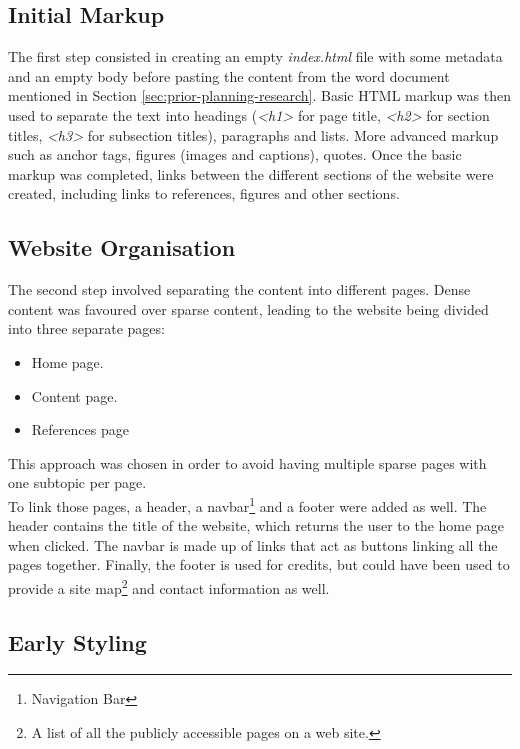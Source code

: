 \documentclass[letterpaper,12pt]{article}
\begin{document}
\subsection{Initial Markup}

The first step consisted in creating an empty \textit{index.html} file with some metadata and an empty body before pasting the content from the word document mentioned in Section \ref{sec:prior-planning-research}. Basic HTML markup was then used to separate the text into headings (\textit{\textless h1\textgreater} for page title, \textit{\textless h2\textgreater} for section titles, \textit{\textless h3\textgreater} for subsection titles), paragraphs and lists. More advanced markup such as anchor tags, figures (images and captions), quotes. Once the basic markup was completed, links between the different sections of the website were created, including links to references, figures and other sections.

\subsection{Website Organisation}

The second step involved separating the content into different pages. Dense content was favoured over sparse content, leading to the website being divided into three separate pages:
\begin{itemize}
    \item Home page.
    \item Content page.
    \item References page
\end{itemize}
This approach was chosen in order to avoid having multiple sparse pages with one subtopic per page.\\

To link those pages, a header, a navbar\footnote{Navigation Bar} and a footer were added as well. The header contains the title of the website, which returns the user to the home page when clicked. The navbar is made up of links that act as buttons linking all the pages together. Finally, the footer is used for credits, but could have been used to provide a site map\footnote{A list of all the publicly accessible pages on a web site.} and contact information as well.

\subsection{Early Styling}
\end{document}

